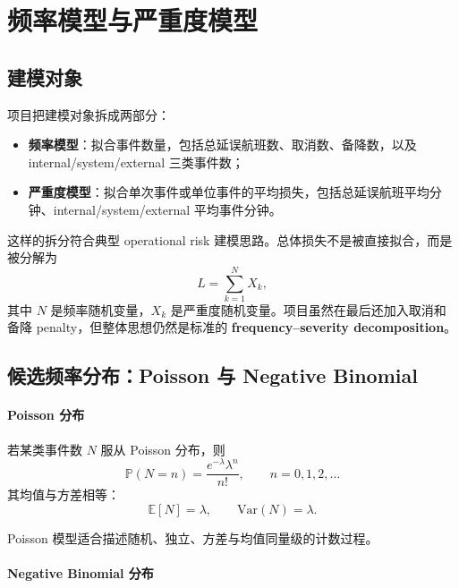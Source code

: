 \section{频率模型与严重度模型}

\subsection{建模对象}

项目把建模对象拆成两部分：
\begin{itemize}[leftmargin=2.2em]
  \item \textbf{频率模型}：拟合事件数量，包括总延误航班数、取消数、备降数，以及 internal/system/external 三类事件数；
  \item \textbf{严重度模型}：拟合单次事件或单位事件的平均损失，包括总延误航班平均分钟、internal/system/external 平均事件分钟。
\end{itemize}

这样的拆分符合典型 operational risk 建模思路。总体损失不是被直接拟合，而是被分解为
\begin{equation}
L = \sum_{k=1}^{N} X_k,
\end{equation}
其中 $N$ 是频率随机变量，$X_k$ 是严重度随机变量。项目虽然在最后还加入取消和备降 penalty，但整体思想仍然是标准的 \textbf{frequency--severity decomposition}。

\subsection{候选频率分布：Poisson 与 Negative Binomial}

\paragraph{Poisson 分布}

若某类事件数 $N$ 服从 Poisson 分布，则
\begin{equation}
\mathbb{P}(N=n) = \frac{e^{-\lambda}\lambda^n}{n!}, \qquad n=0,1,2,\dots
\end{equation}
其均值与方差相等：
\begin{equation}
\mathbb{E}[N]=\lambda, \qquad \mathrm{Var}(N)=\lambda.
\end{equation}

Poisson 模型适合描述随机、独立、方差与均值同量级的计数过程。

\paragraph{Negative Binomial 分布}

